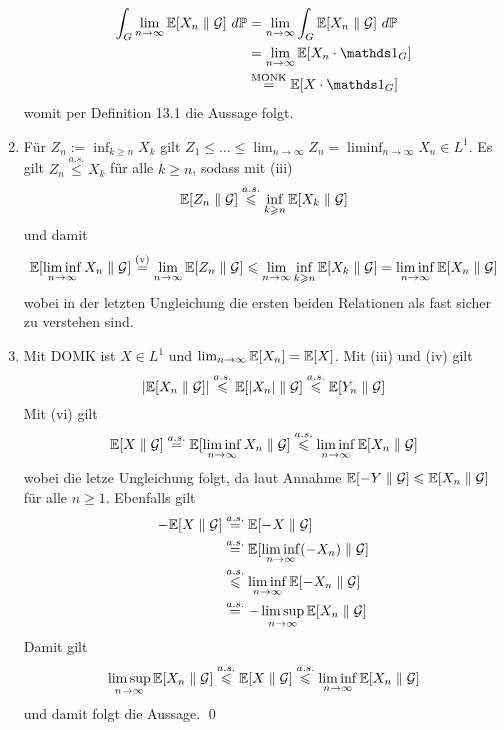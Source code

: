 \begin{enumerate}[label=(\roman*)]
         \begin{align*}
             \int_G\lim_{n\to\infty}\E[X_n\parallel\G]\ d\Pp&=\lim_{n\to\infty}\int_G\E[X_n\parallel\G]\ d\Pp\\
             &=\lim_{n\to\infty}\E[X_n\cdot\ind{G}]\\
             &\overset{\text{MONK}}{=}\E[X\cdot\ind{G}]
         \end{align*}
         womit per Definition 13.1 die Aussage folgt.
         \item F\"ur $Z_n:=\inf_{k\geq n}X_k$ gilt $Z_1\leq\hdots\leq\lim_{n\to\infty}Z_n=\liminf_{n\to\infty}X_n\in L^1$. Es gilt $Z_n\overset{a.s.}{\leq}X_k$ f\"ur alle $k\geq n$, sodass mit (iii)
         $$\mathbb{E}[Z_n\parallel\mathcal{G}]\overset{a.s.}{\leqslant}\inf_{k\geqslant n}\mathbb{E}[X_k\parallel\mathcal{G}]$$
         und damit
         \begin{align*}
             \mathbb{E}[\liminf_{n\to\infty}X_n\parallel\mathcal{G}]\overset{\text{(v)}}{=}\lim_{n\to\infty}\mathbb{E}[Z_n\parallel\mathcal{G}]\leqslant\lim_{n\to\infty}\inf_{k\geqslant n}\mathbb{E}[X_k\parallel\mathcal{G}]=\liminf_{n\to\infty}\mathbb{E}[X_n\parallel\mathcal{G}]
         \end{align*} 
         wobei in der letzten Ungleichung die ersten beiden Relationen als fast sicher zu verstehen sind.
         \item Mit DOMK ist $X\in L^1$ und $\lim_{n\to\infty}\mathbb{E}[X_n]=\mathbb{E}[X]$. Mit (iii) und (iv) gilt 
         $$|\mathbb{E}[X_n\parallel\mathcal{G}]|\overset{a.s.}{\leqslant}\mathbb{E}[|X_n|\parallel\mathcal{G}]\overset{a.s.}{\leqslant}\mathbb{E}[Y_n\parallel\mathcal{G}]$$
         Mit (vi) gilt
         $$\mathbb{E}[X\parallel\mathcal{G}]\overset{a.s.}{=}\mathbb{E}[\liminf_{n\to\infty}X_n\parallel\mathcal{G}]\overset{a.s.}{\leqslant}\liminf_{n\to\infty}\mathbb{E}[X_n\parallel\mathcal{G}]$$
         wobei die letze Ungleichung folgt, da laut Annahme $\mathbb{E}[-Y\parallel\mathcal{G}]\leqslant\mathbb{E}[X_n\parallel\mathcal{G}]$ f\"ur alle $n\geq1$. Ebenfalls gilt
         \begin{align*}
             -\mathbb{E}[X\parallel\mathcal{G}]&\overset{a.s.}{=}\mathbb{E}[-X\parallel\mathcal{G}]\\
             &\overset{a.s.}{=}\mathbb{E}[\liminf_{n\to\infty}(-X_n)\parallel\mathcal{G}]\\
             &\overset{a.s.}{\leqslant}\liminf_{n\to\infty}\mathbb{E}[-X_n\parallel\mathcal{G}]\\
             &\overset{a.s.}{=}-\limsup_{n\to\infty}\mathbb{E}[X_n\parallel\mathcal{G}]
         \end{align*}
         Damit gilt 
         $$\limsup_{n\to\infty}\mathbb{E}[X_n\parallel\mathcal{G}]\overset{a.s.}{\leqslant}\mathbb{E}[X\parallel\mathcal{G}]\overset{a.s.}{\leqslant}\liminf_{n\to\infty}\mathbb{E}[X_n\parallel\mathcal{G}]$$
         und damit folgt die Aussage. \qed
     \end{enumerate}
     
